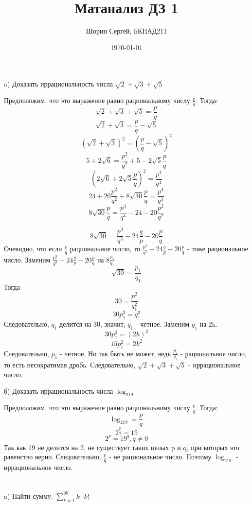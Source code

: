 \documentclass[a4paper]{article}
\author{Шорин Сергей, БКНАД211}
\title{Матанализ ДЗ 1}
\date{\today}
\begin{document}
\maketitle

\newpage

\section{}
a) Доказать иррациональность числа $\sqrt{2} + \sqrt{3} + \sqrt{5}$

Предположим, что это выражение равно рациональному числу $\frac{ p}{q}$. Тогда:
\[\sqrt{2} + \sqrt{3} + \sqrt{5} = \frac{p}{q}\]
\[\sqrt{2} + \sqrt{3}  = \frac{p}{q} - \sqrt{5}\]
\[(\sqrt{2} + \sqrt{3})^2  = (\frac{p}{q} - \sqrt{5})^2\]
\[ 5 +  2\sqrt{6} = \frac{p^2}{q^2} + 5 - 2\sqrt{5}\frac{p}{q}\]
\[ (2\sqrt{6} + 2\sqrt{5}\frac{p}{q})^2= \frac{p^4}{q^4}\]
\[ 24 + 20\frac{p^2}{q^2} + 8\sqrt{30}\frac{p}{q}= \frac{p^4}{q^4}\]
\[  8\sqrt{30}\frac{p}{q}= \frac{p^4}{q^4} - 24 -  20\frac{p^2}{q^2}\]

\[  8\sqrt{30}= \frac{p^3}{q^3} - 24\frac{q}{p} -  20\frac{p}{q}\]
Очевидно, что если $\frac{ p}{q}$ рациональное число, то $\frac{p^3}{q^3} - 24\frac{q}{p} -  20\frac{p}{q}$ - тоже рациональное число. Заменим $\frac{p^3}{q^3} - 24\frac{q}{p} -  20\frac{p}{q}$ на $8\frac{p_1}{q_1}$
\[  \sqrt{30}= \frac{p_1}{q_1}\]
Тогда
\[  30 = \frac{p_1^2}{q_1^2}\]
\[  30 p_1^2= q_1^2\]
Следовательно, $q_1$ делится на 30, значит, $q_1$ - четное. Заменим $q_1$ на 2k.
\[  30 p_1^2= (2k)^2\]
\[  15 p_1^2= 2k^2\]
Следовательно, $p_1$ - четное. Но так быть не может, ведь $\frac{p_1}{q_1}$ - рациональное число, то есть несократимая дробь. Следовательно, $\sqrt{2} + \sqrt{3} + \sqrt{5}$ - иррациональное число.

\newpage
б) Доказать иррациональность числа $\log_219$


Предположим, что это выражение равно рациональному числу $\frac{ p}{q}$. Тогда:
\[\log_219 = \frac{ p}{q}\]
\[2^{\frac{ p}{q}} = 19\]
\[2^p = 19^q, q \neq 0\]
Так как 19 не делится на 2, не существует таких целых p и q, при которых это равенство верно. Следовательно, $\frac{ p}{q}$ - не рациональное число. Поэтому $\log_219$ - иррациональное число.

\section{}


a) Найти сумму: $\sum^{99}_{k=1}k\cdot k!$
\end{document}
